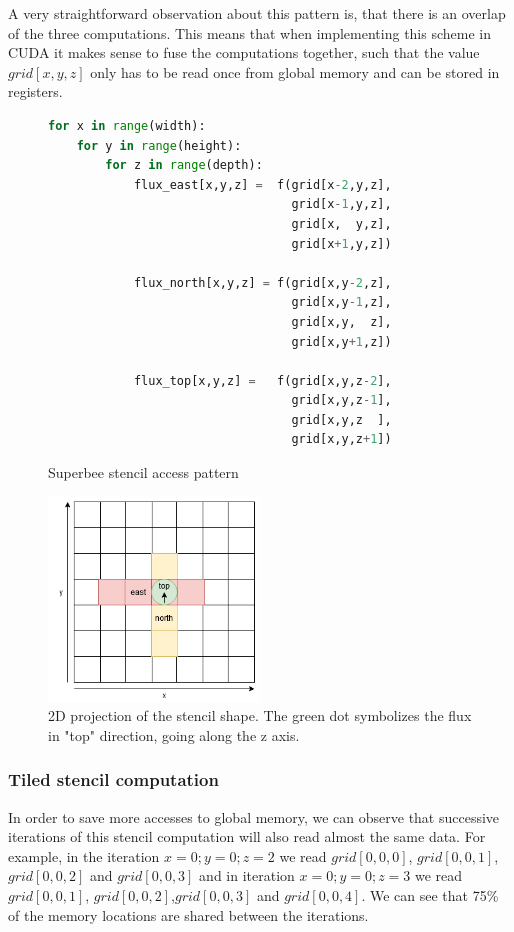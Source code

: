 \documentclass[a4paper,oneside]{memoir}
\begin{document}
A very straightforward observation about this pattern is, that there is an overlap of the three computations. This means that when implementing this scheme in CUDA it makes sense to fuse the computations together, such that the value $grid\left[x,y,z\right]$ only has to be read once from global memory and can be stored in registers.
\begin{figure}[hbtp]
    \caption{Superbee stencil access pattern}
    \label{fig:stencil_code}
    \begin{lstlisting}[language=python,frame=single]
for x in range(width):
    for y in range(height):
        for z in range(depth):
            flux_east[x,y,z] =  f(grid[x-2,y,z], 
                                  grid[x-1,y,z],
                                  grid[x,  y,z],
                                  grid[x+1,y,z])

            flux_north[x,y,z] = f(grid[x,y-2,z], 
                                  grid[x,y-1,z],
                                  grid[x,y,  z],
                                  grid[x,y+1,z])

            flux_top[x,y,z] =   f(grid[x,y,z-2], 
                                  grid[x,y,z-1],
                                  grid[x,y,z  ],
                                  grid[x,y,z+1])
    \end{lstlisting}
\end{figure}
\begin{figure}[h]
    \centering
    \includegraphics[width=0.5\textwidth]{stencil.png}
    \caption{2D projection of the stencil shape. The green dot symbolizes the flux in "top" direction, going along the z axis.}
    \label{fig:stencil_shape}
\end{figure}
\subsubsection{Tiled stencil computation}
In order to save more accesses to global memory, we can observe that successive iterations of this stencil computation will also read almost the same data.
For example, in the iteration $x = 0 ; y = 0 ; z = 2$ we read $grid[0,0,0]$, $grid[0,0,1]$,$grid[0,0,2]$ and $grid[0,0,3]$ and in iteration $x = 0 ; y = 0 ; z = 3$
we read $grid[0,0,1]$, $grid[0,0,2]$,$grid[0,0,3]$ and $grid[0,0,4]$. We can see that 75\% of the memory locations are shared between the iterations.
\end{document}
